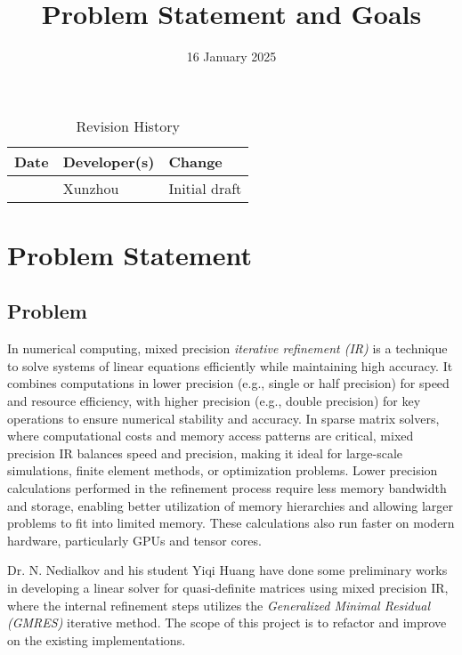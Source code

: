 \documentclass{article}
\title{Problem Statement and Goals\\\progname}
\author{\authname}
\date{}
\begin{document}
\maketitle

\begin{table}[hp]
  \caption{Revision History} \label{TblRevisionHistory}
  \begin{tabularx}{\textwidth}{llX}
    \toprule
    \textbf{Date} & \textbf{Developer(s)} & \textbf{Change}\\
    \midrule
    \date{16 January 2025} & Xunzhou & Initial draft \\
    \bottomrule
  \end{tabularx}
\end{table}

\section{Problem Statement}



\subsection{Problem}

In numerical computing, mixed precision \emph{iterative refinement (IR)} is a
technique to solve systems of linear equations efficiently while maintaining
high accuracy. It combines computations in lower precision (e.g., single or half
precision) for speed and resource efficiency, with higher precision (e.g.,
double precision) for key operations to ensure numerical stability and accuracy.
In sparse matrix solvers, where computational costs and memory access patterns
are critical, mixed precision IR balances speed and precision, making it ideal
for large-scale simulations, finite element methods, or optimization problems.
Lower precision calculations performed in the refinement process require less
memory bandwidth and storage, enabling better utilization of memory hierarchies
and allowing larger problems to fit into limited memory. These calculations also
run faster on modern hardware, particularly GPUs and tensor cores.

Dr. N. Nedialkov and his student Yiqi Huang have done some preliminary works in
developing a linear solver for quasi-definite matrices using mixed precision IR,
where the internal refinement steps utilizes the \emph{Generalized Minimal
  Residual (GMRES)} iterative method. The scope of this project is to refactor
and improve on the existing implementations.
\end{document}
